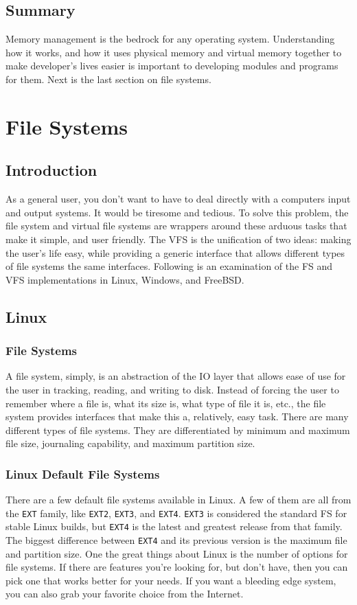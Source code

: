 \documentclass[10pt,letterpaper,onecolumn,draftclsnofoot]{IEEEtran}
\begin{document}
\subsection{Summary}
Memory management is the bedrock for any operating system. Understanding
how it works, and how it uses physical memory and virtual memory together to make developer's lives easier is important to developing modules and programs for them. Next is the last section on file systems.

\section{File Systems}
\subsection{Introduction}
As a general user, you don't want to have to deal directly with a computers
input and output systems. It would be tiresome and tedious. To solve this
problem, the file system and virtual file systems are wrappers around these
arduous tasks that make it simple, and user friendly. The VFS is the unification
of two ideas: making the user's life easy, while providing a generic interface
that allows different types of file systems the same interfaces. Following is
an examination of the FS and VFS implementations in Linux, Windows, and FreeBSD.
\subsection{Linux}
\subsubsection{File Systems}
A file system, simply, is an abstraction of the IO layer that allows ease of
use for the user in tracking, reading, and writing to disk. Instead of forcing
the user to remember where a file is, what its size is, what type of file it
is, etc., the file system provides interfaces that make this a, relatively,
easy task. There are many different types of file systems. They are
differentiated by minimum and maximum file size, journaling capability, and
maximum partition size.
\subsubsection{Linux Default File Systems}
There are a few default file systems available in Linux. A few of them are
all from the \texttt{EXT} family, like \texttt{EXT2}, \texttt{EXT3}, and
\texttt{EXT4}. \texttt{EXT3} is considered the standard FS for stable Linux
builds, but \texttt{EXT4} is the latest and greatest release from that family.
The biggest difference between \texttt{EXT4} and its previous version is the
maximum file and partition size.\cite{anthonyjsimon2015}
One the great things about Linux is the number of options for file systems.
If there are features you're looking for, but don't have, then you can pick
one that works better for your needs. If you want a bleeding edge system, you
can also grab your favorite choice from the Internet.
\end{document}
